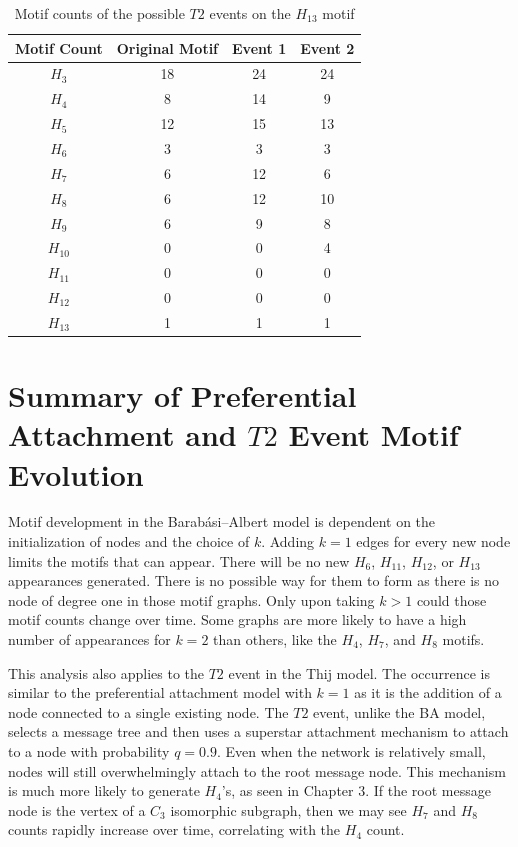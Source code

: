 \begin{table}
    \centering
    \begin{tabular}{||c c c c||} 
    \hline
    Motif Count & Original Motif & Event 1 & Event 2 \\ [0.5ex] 
    \hline\hline
    $H_{3}$ & 18 & 24 & 24\\ 
    \hline
    $H_{4}$ & 8 & 14 & 9  \\
    \hline
    $H_{5}$ & 12 & 15 & 13  \\
    \hline
    $H_{6}$ & 3 & 3 &3  \\
    \hline
    $H_{7}$ & 6 & 12 & 6 \\
    \hline
    $H_{8}$ & 6 & 12 & 10\\
    \hline
    $H_{9}$ & 6 & 9 & 8 \\
    \hline
    $H_{10}$ & 0 & 0 & 4  \\
    \hline
    $H_{11}$ & 0 & 0 & 0  \\
    \hline
    $H_{12}$ & 0 & 0 & 0 \\
    \hline
    $H_{13}$ & 1 & 1 & 1 \\
    \hline
   \end{tabular}
   \caption{Motif counts of the possible $T2$ events on the $H_{13}$ motif}
   \label{table:11}
\end{table}

\section{Summary of Preferential Attachment and \texorpdfstring{$T2$}{T2} Event Motif Evolution}


Motif development in the Barabási–Albert model is dependent on the initialization of nodes and 
the choice of $k$. Adding $k=1$ edges for every new node
 limits the motifs that can appear. There will be no new $H_{6}$, $H_{11}$,
$H_{12}$, or $H_{13}$ appearances generated. There is no possible way for them to form as there is no
node of degree one in those motif graphs. Only upon taking $k>1$ could those motif counts change over
 time. Some graphs are more likely to have a high number of appearances for $k=2$ than others, like the $H_{4}$, $H_{7}$, and $H_{8}$ motifs.

This analysis also applies to the $T2$ event in the Thij model. The occurrence is similar to
the preferential attachment model with $k=1$ as it is the addition of a node 
connected to a single existing node. The $T2$ event, unlike the BA model, selects a message tree 
and then uses a superstar attachment mechanism to attach to a node with probability $q=0.9$. Even when the network is relatively
small, nodes will still overwhelmingly attach to the root message node. This mechanism is
much more likely to generate $H_{4}$'s, as seen in Chapter 3. If the root
message node is the vertex of a $C_3$ isomorphic subgraph, then we may see $H_{7}$ and $H_{8}$ counts
rapidly increase over time, correlating with the $H_{4}$ count. 

